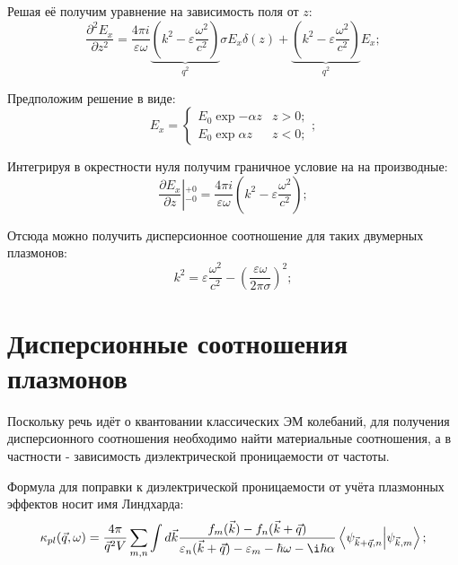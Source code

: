 \documentclass[../main.tex]{subfiles}
\begin{document}
    Решая её получим уравнение на зависимость поля от $z$:
    \begin{equation}
        \frac{\partial^2 E_x}{\partial z^2} = \frac{4\pi i}{\varepsilon \omega}
        \underbrace{\left(k^2  - \varepsilon \frac{\omega^2}{c^2}\right)}_{q^2} \sigma E_x \delta(z)
        + \underbrace{\left(k^2  - \varepsilon \frac{\omega^2}{c^2}\right)}_{q^2} E_x;
    \end{equation}

    Предположим решение в виде:
    \begin{equation*}
        E_x = \left\{
            \begin{aligned}
                E_0 \exp{-\alpha z} & z > 0;\\
                E_0 \exp{\alpha z} & z < 0;
            \end{aligned}
        \right.;
    \end{equation*}

    Интегрируя в окрестности нуля получим граничное условие на на производные:
    \begin{equation*}
        \left.\frac{\partial E_x}{\partial z}\right\vert{}^{+0}_{-0} = \frac{4\pi i}{\varepsilon \omega}
        \left(k^2  - \varepsilon \frac{\omega^2}{c^2}\right);
    \end{equation*}

    Отсюда можно получить дисперсионное соотношение для таких двумерных плазмонов:
    \begin{equation}
        \label{plasmons:disp}
        k^2  = \varepsilon  \frac{\omega^2}{c^2} - \left(\frac{\varepsilon\omega}{2\pi \sigma}\right)^2;
    \end{equation}
    
    \section{Дисперсионные соотношения плазмонов}

    Поскольку речь идёт о квантовании классических ЭМ колебаний, 
    для получения дисперсионного соотношения необходимо найти 
    материальные соотношения, а в частности - зависимость 
    диэлектрической проницаемости от частоты.

    Формула для поправки к диэлектрической проницаемости от 
    учёта плазмонных эффектов носит имя Линдхарда:
    \begin{equation}
        \label{lindhard}
        \kappa_{pl}(\vec q, \omega) = \frac{4\pi}{\vec{q}^2 V}
            \sum_{m, n} \int d\vec k \frac{f_m(\vec k) - f_n(\vec k 
                + \vec q)}{\varepsilon_n(\vec k + \vec q) - 
                \varepsilon_m - \hbar \omega - \i \hbar \alpha}
                \bra{\psi_{\vec k + \vec q,n}} \ket{\psi_{\vec k, m}};
    \end{equation}
\end{document}

